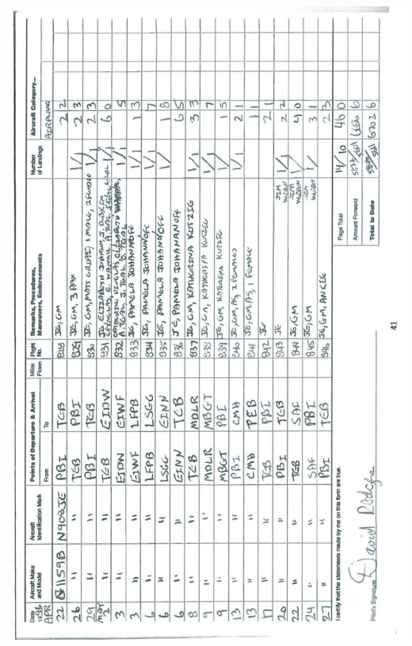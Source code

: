 \documentclass[10pt]{article}
\begin{document}
\includegraphics[max width=\textwidth, center]{2025_02_27_dd68c3d38de88f0516d9g-045}\\
\end{document}

